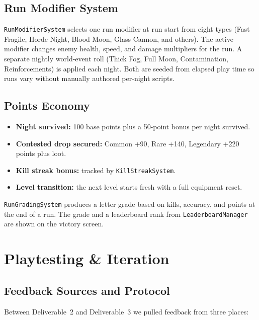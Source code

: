 \documentclass[11pt,a4paper]{article}
\begin{document}
\subsection{Run Modifier System}

\texttt{RunModifierSystem} selects one run modifier at run start from eight types (Fast Fragile, Horde Night, Blood Moon, Glass Cannon, and others). The active modifier changes enemy health, speed, and damage multipliers for the run. A separate nightly world-event roll (Thick Fog, Full Moon, Contamination, Reinforcements) is applied each night. Both are seeded from elapsed play time so runs vary without manually authored per-night scripts.

\subsection{Points Economy}

\begin{itemize}[noitemsep]
  \item \textbf{Night survived:} 100 base points plus a 50-point bonus per night survived.
  \item \textbf{Contested drop secured:} Common +90, Rare +140, Legendary +220 points plus loot.
  \item \textbf{Kill streak bonus:} tracked by \texttt{KillStreakSystem}.
  \item \textbf{Level transition:} the next level starts fresh with a full equipment reset.
\end{itemize}

\texttt{RunGradingSystem} produces a letter grade based on kills, accuracy, and points at the end of a run. The grade and a leaderboard rank from \texttt{LeaderboardManager} are shown on the victory screen.

\section{Playtesting \& Iteration}

\subsection{Feedback Sources and Protocol}

Between Deliverable~2 and Deliverable~3 we pulled feedback from three places:
\end{document}
